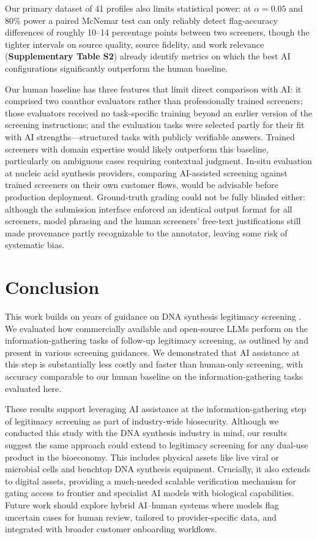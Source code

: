 \documentclass[utf8]{FrontiersinHarvard}
\begin{document}
Our primary dataset of 41 profiles also limits statistical power: at $\alpha = 0.05$ and 80\% power a paired McNemar test can only reliably detect flag-accuracy differences of roughly 10--14 percentage points between two screeners, though the tighter intervals on source quality, source fidelity, and work relevance (\textbf{Supplementary Table S2}) already identify metrics on which the best AI configurations significantly outperform the human baseline.

Our human baseline has three features that limit direct comparison with AI: it comprised two coauthor evaluators rather than professionally trained screeners; those evaluators received no task-specific training beyond an earlier version of the screening instructions; and the evaluation tasks were selected partly for their fit with AI strengths---structured tasks with publicly verifiable answers. Trained screeners with domain expertise would likely outperform this baseline, particularly on ambiguous cases requiring contextual judgment. In-situ evaluation at nucleic acid synthesis providers, comparing AI-assisted screening against trained screeners on their own customer flows, would be advisable before production deployment. Ground-truth grading could not be fully blinded either: although the submission interface enforced an identical output format for all screeners, model phrasing and the human screeners' free-text justifications still made provenance partly recognizable to the annotator, leaving some risk of systematic bias.

\section{Conclusion}

This work builds on years of guidance on DNA synthesis legitimacy screening \citep{CarterFriedman2015, Alexanian2024, IGSC2024}. We evaluated how commercially available and open-source LLMs perform on the information-gathering tasks of follow-up legitimacy screening, as outlined by \citet{Alexanian2024} and present in various screening guidances. We demonstrated that AI assistance at this step is substantially less costly and faster than human-only screening, with accuracy comparable to our human baseline on the information-gathering tasks evaluated here.

These results support leveraging AI assistance at the information-gathering step of legitimacy screening as part of industry-wide biosecurity. Although we conducted this study with the DNA synthesis industry in mind, our results suggest the same approach could extend to legitimacy screening for any dual-use product in the bioeconomy. This includes physical assets like live viral or microbial cells and benchtop DNA synthesis equipment. Crucially, it also extends to digital assets, providing a much-needed scalable verification mechanism for gating access to frontier and specialist AI models with biological capabilities. Future work should explore hybrid AI--human systems where models flag uncertain cases for human review, tailored to provider-specific data, and integrated with broader customer onboarding workflows.
\end{document}
